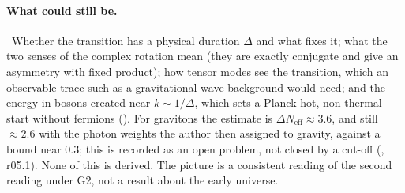 \paragraph{What could still be.} \Open\ Whether the transition has a physical duration $\Delta$ and what fixes it; what
the two senses of the complex rotation mean (they are exactly conjugate and give an asymmetry with fixed product); how
tensor modes see the transition, which an observable trace such as a gravitational-wave background would need; and the
energy in bosons created near $k\sim1/\Delta$, which sets a Planck-hot, non-thermal start without fermions (). For
gravitons the estimate is $\Delta N_{\mathrm{eff}}\approx3.6$, and still $\approx2.6$ with the photon weights the author then
assigned to gravity, against a bound near $0.3$; this is recorded as an open problem, not closed by a cut-off (,
r05.1). None of this is derived. The picture is a consistent reading
of the second reading under G2, not a result about the early universe.
